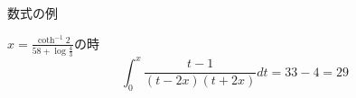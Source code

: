 \begin{frame}{数式の例}

    $x=\frac{\coth^{-1}2}{58+\log\frac{4}{3} }$の時
    \begin{equation}
        \int_{0}^{x}\frac{t-1}{\left( t-2x \right)\left( t+2x \right)}dt=33-4=29
    \end{equation}

\end{frame}
